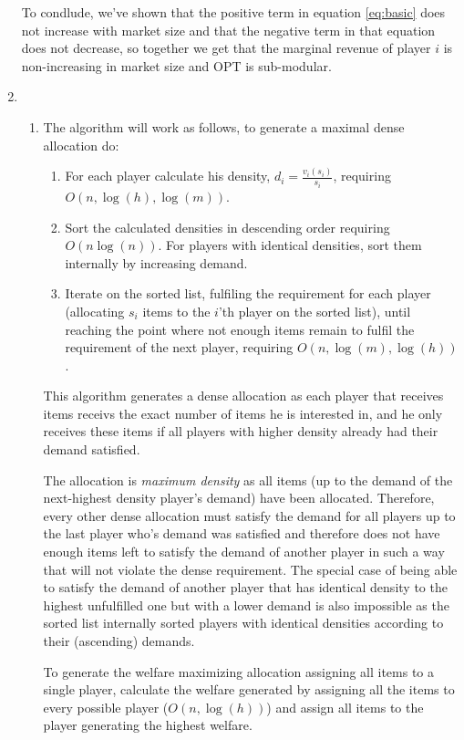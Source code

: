 \documentclass[a4page,notitlepage]{article}
\begin{document}
\begin{enumerate}
To condlude, we've shown that the positive term in equation \ref{eq:basic} does not increase with market size and that the negative term in that equation does not decrease, so together we get that the marginal revenue of player $i$ is non-increasing in market size and OPT is sub-modular.

\item
  \begin{enumerate}
  \item The algorithm will work as follows, to generate a maximal
    dense allocation do:
    \begin{enumerate}
    \item For each player calculate his density, $d_i=\frac{v_i(s_i)}{s_i}$, requiring $O(n,\log(h),\log(m))$.
    \item Sort the calculated densities in descending order requiring $O(n\log(n))$.
      For players with identical densities, sort them internally by increasing demand.
    \item Iterate on the sorted list, fulfiling the requirement for
      each player (allocating $s_i$ items to the $i$'th player on the sorted list), until reaching the point where not enough items
      remain to fulfil the requirement of the next player, requiring $O(n,\log(m),\log(h))$.
    \end{enumerate}
    This algorithm generates a dense allocation as each player that receives items receivs the exact number of items he is interested in, and he only receives these items if all players with higher density already had their demand satisfied.

    The allocation is \textit{maximum density} as all items (up to the demand of the next-highest density player's demand) have been allocated.
Therefore, every other dense allocation must satisfy the demand for all players up to the last player who's demand was satisfied and therefore does not have enough items left to satisfy the demand of another player in such a way that will not violate the dense requirement.
The special case of being able to satisfy the demand of another player that has identical density to the highest unfulfilled one but with a lower demand is also impossible as the sorted list internally sorted players with identical densities according to their (ascending) demands.

    To generate the welfare maximizing allocation assigning all items to a single player, calculate the welfare generated by assigning all the items to every possible player ($O(n,\log(h))$) and assign all items to the player generating the highest welfare.
    

\end{enumerate}
\end{enumerate}
\end{document}
